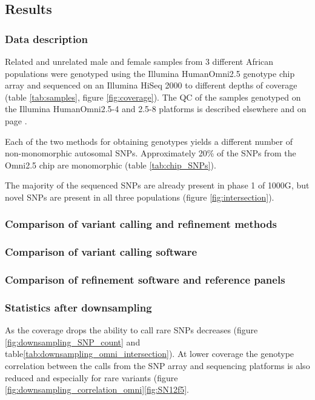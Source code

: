 \subsection{Results}

\subsubsection{Data description}
\label{sec:agv_data_description}
Related and unrelated male and female samples from 3 different African populations were genotyped using the Illumina HumanOmni2.5 genotype chip array and sequenced on an Illumina HiSeq 2000 to different depths of coverage (table \ref{tab:samples}, figure \ref{fig:coverage}). The \gls{QC} of the samples genotyped on the Illumina HumanOmni2.5-4 and 2.5-8 platforms is described elsewhere\cite{Gurdasani2015} and on page \pageref{subsec:chipQC}.

Each of the two methods for obtaining genotypes yields a different number of non-monomorphic autosomal SNPs. Approximately 20\% of the SNPs from the Omni2.5 chip are monomorphic (table \ref{tab:chip_SNPs}).

The majority of the sequenced \glspl{SNP} are already present in phase 1 of \gls{1000G}\cite{1000G2012}, but novel SNPs are present in all three populations (figure \ref{fig:intersection}).

\subsubsection{Comparison of variant calling and refinement methods}
\subsubsection{Comparison of variant calling software}
\subsubsection{Comparison of refinement software and reference panels}

\subsubsection{Statistics after downsampling}

As the coverage drops the ability to call rare \glspl{SNP} decreases (figure \ref{fig:downsampling_SNP_count} and table\ref{tab:downsampling_omni_intersection}). At lower coverage the genotype correlation between the calls from the SNP array and sequencing platforms is also reduced and especially for rare variants (figure \ref{fig:downsampling_correlation_omni}\ref{fig:SN12f5}.


